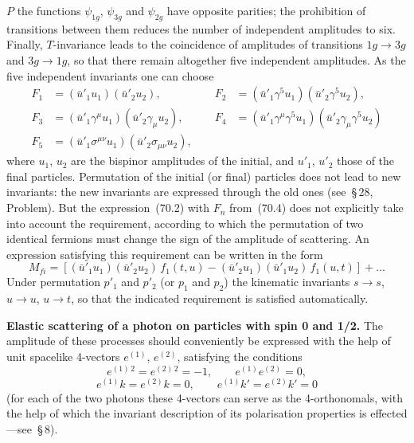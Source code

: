 $P$ the functions $\psi_{1g}$, $\psi_{3g}$ and $\psi_{2g}$ have opposite parities; the prohibition of transitions between them reduces the number of independent amplitudes to six. Finally, $T$-invariance leads to the coincidence of amplitudes of transitions $1g \to 3g$ and $3g \to 1g$, so that there remain altogether five independent amplitudes. As the five independent invariants one can choose
\begin{equation}
\begin{aligned}
F_1 &= (\bar{u}'_1 u_1)(\bar{u}'_2 u_2),\qquad & F_2 &= (\bar{u}'_1\gamma^5 u_1)(\bar{u}'_2\gamma^5 u_2),\\[3pt]
F_3 &= (\bar{u}'_1\gamma^\mu u_1)(\bar{u}'_2\gamma_\mu u_2),\qquad & F_4 &= (\bar{u}'_1\gamma^\mu\gamma^5 u_1)(\bar{u}'_2\gamma_\mu\gamma^5 u_2)\\[3pt]
F_5 &= (\bar{u}'_1\sigma^{\mu\nu}u_1)(\bar{u}'_2\sigma_{\mu\nu}u_2),
\end{aligned}
\tag{70.4}
\end{equation}
where $u_1$, $u_2$ are the bispinor amplitudes of the initial, and $u'_1$, $u'_2$ those of the final particles. Permutation of the initial (or final) particles does not lead to new invariants: the new invariants are expressed through the old ones (see~\S\,28, Problem). But the expression~(70.2) with $F_n$ from~(70.4) does not explicitly take into account the requirement, according to which the permutation of two identical fermions must change the sign of the amplitude of scattering. An expression satisfying this requirement can be written in the form
\[
M_{fi} = [(\bar{u}'_1 u_1)(\bar{u}'_2 u_2)\,f_1(t, u) - (\bar{u}'_2 u_1)(\bar{u}'_1 u_2)\,f_1(u, t)] + \ldots
\tag{70.5}
\]
Under permutation $p'_1$ and $p'_2$ (or $p_1$ and $p_2$) the kinematic invariants $s \to s$, $u \to u$, $u \to t$, so that the indicated requirement is satisfied automatically.

\textbf{Elastic scattering of a photon on particles with spin 0 and 1/2.} The amplitude of these processes should conveniently be expressed with the help of unit spacelike 4-vectors $e^{(1)}$, $e^{(2)}$, satisfying the conditions
\begin{equation}
e^{(1)\,2} = e^{(2)\,2} = -1,\qquad e^{(1)}e^{(2)} = 0,
\tag{70.6}
\end{equation}
\[
e^{(1)}k = e^{(2)}k = 0,\qquad e^{(1)}k' = e^{(2)}k' = 0
\]
(for each of the two photons these 4-vectors can serve as the 4-orthonomals, with the help of which the invariant description of its polarisation properties is effected---see~\S\,8).

